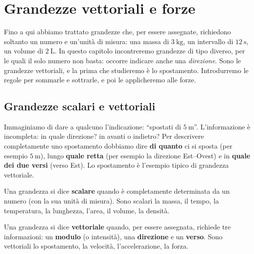 \chapter{Grandezze vettoriali e forze}

Fino a qui abbiamo trattato grandezze che, per essere assegnate, richiedono soltanto un numero e un'unità di misura: una massa di $\SI{3}{\kilo\gram}$, un intervallo di $\SI{12}{\second}$, un volume di $\SI{2}{\liter}$. In questo capitolo incontreremo grandezze di tipo diverso, per le quali il solo numero non basta: occorre indicare anche una \textit{direzione}. Sono le grandezze vettoriali, e la prima che studieremo è lo spostamento. Introdurremo le regole per sommarle e sottrarle, e poi le applicheremo alle forze.

\section{Grandezze scalari e vettoriali}

Immaginiamo di dare a qualcuno l'indicazione: ``spostati di $\SI{5}{\meter}$''. L'informazione è incompleta: in quale direzione? in avanti o indietro? Per descrivere completamente uno spostamento dobbiamo dire \textbf{di quanto} ci si sposta (per esempio $\SI{5}{\meter}$), lungo \textbf{quale retta} (per esempio la direzione Est--Ovest) e in \textbf{quale dei due versi} (verso Est). Lo spostamento è l'esempio tipico di grandezza vettoriale.

\begin{definizione}
Una grandezza si dice \textbf{scalare} quando è completamente determinata da un numero (con la sua unità di misura). Sono scalari la massa, il tempo, la temperatura, la lunghezza, l'area, il volume, la densità.
\end{definizione}

\begin{definizione}
Una grandezza si dice \textbf{vettoriale} quando, per essere assegnata, richiede tre informazioni: un \textbf{modulo} (o intensità), una \textbf{direzione} e un \textbf{verso}. Sono vettoriali lo spostamento, la velocità, l'accelerazione, la forza.
\end{definizione}

